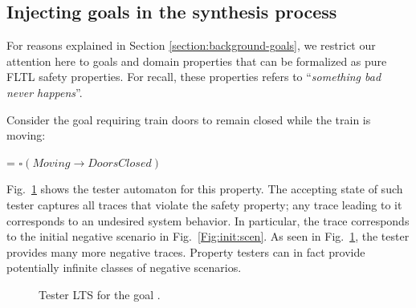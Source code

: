 
\subsection{Injecting goals in the synthesis process\label{subsection:induction-pruning-with-goals}}

For reasons explained in Section \ref{section:background-goals}, we restrict our attention here to goals and domain properties that can be formalized as pure FLTL safety properties. For recall, these properties refers to  ``\emph{something bad never happens}''.

Consider the goal requiring train doors to remain closed while the train is moving:
\begin{center}
 = $\square(Moving \rightarrow DoorsClosed)$
\end{center}

Fig.~\ref{Fig.:tester-automaton-inductive} shows the tester automaton for this property. The accepting state of such tester captures all traces that violate the safety property; any trace leading to it corresponds to an undesired system behavior. In particular, the trace  corresponds to the initial negative scenario in Fig.~\ref{Fig:init:scen}. As seen in Fig.~\ref{Fig.:tester-automaton-inductive}, the tester provides many more negative traces. Property testers can in fact provide potentially infinite classes of negative scenarios.

\begin{figure}
\centering
{}
\caption{Tester LTS for the goal .\label{Fig.:tester-automaton-inductive}}
\end{figure}

